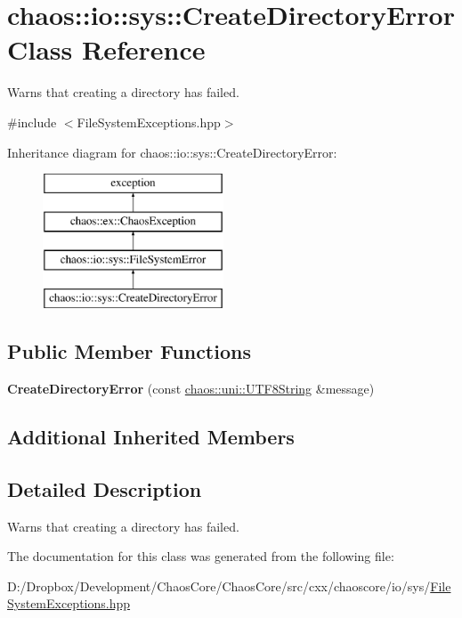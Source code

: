 \hypertarget{classchaos_1_1io_1_1sys_1_1_create_directory_error}{}\section{chaos\+:\+:io\+:\+:sys\+:\+:Create\+Directory\+Error Class Reference}
\label{classchaos_1_1io_1_1sys_1_1_create_directory_error}


Warns that creating a directory has failed.  




{\ttfamily \#include $<$File\+System\+Exceptions.\+hpp$>$}

Inheritance diagram for chaos\+:\+:io\+:\+:sys\+:\+:Create\+Directory\+Error\+:\begin{figure}[H]
\begin{center}
\leavevmode
\includegraphics[height=4.000000cm]{classchaos_1_1io_1_1sys_1_1_create_directory_error}
\end{center}
\end{figure}
\subsection*{Public Member Functions}
\begin{DoxyCompactItemize}
\item 
\hypertarget{classchaos_1_1io_1_1sys_1_1_create_directory_error_aab9a24330c9607be0391dbbe08149fcf}{}{\bfseries Create\+Directory\+Error} (const \hyperlink{classchaos_1_1uni_1_1_u_t_f8_string}{chaos\+::uni\+::\+U\+T\+F8\+String} \&message)\label{classchaos_1_1io_1_1sys_1_1_create_directory_error_aab9a24330c9607be0391dbbe08149fcf}

\end{DoxyCompactItemize}
\subsection*{Additional Inherited Members}


\subsection{Detailed Description}
Warns that creating a directory has failed. 

The documentation for this class was generated from the following file\+:\begin{DoxyCompactItemize}
\item 
D\+:/\+Dropbox/\+Development/\+Chaos\+Core/\+Chaos\+Core/src/cxx/chaoscore/io/sys/\hyperlink{_file_system_exceptions_8hpp}{File\+System\+Exceptions.\+hpp}\end{DoxyCompactItemize}
